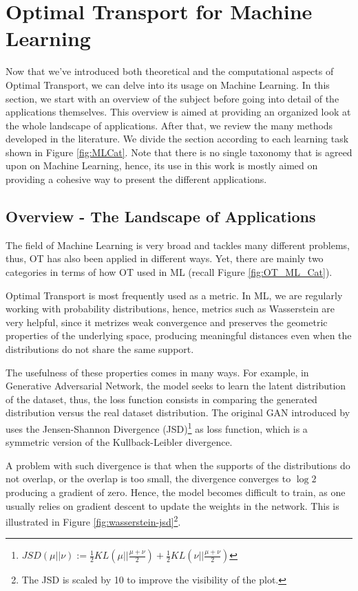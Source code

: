 \newpage
\chapter{Optimal Transport for Machine Learning}
\label{ch:otml}

Now that we've introduced both theoretical and the computational aspects of Optimal Transport,
we can delve into its usage on Machine Learning.
In this section, we start with an overview of the subject
before going into detail of the applications themselves.
This overview is aimed at providing an organized look at the whole landscape of applications.
After that, we review the many methods developed in the literature. 
We divide the section according to each learning task shown in Figure \ref{fig:MLCat}.
Note that there is no single taxonomy that is agreed upon on Machine Learning, hence,
its use in this work is mostly aimed on providing a cohesive way to present the different applications.

\section{Overview - The Landscape of Applications}

The field of Machine Learning is very broad and tackles many different problems, thus,
OT has also been applied in different ways. Yet, there are
mainly two categories in terms of how OT used in ML (recall Figure \ref{fig:OT_ML_Cat}).

Optimal Transport is most frequently used as a metric.
In ML, we are regularly working with probability distributions,
hence, metrics such as Wasserstein are very helpful, since
it metrizes weak convergence and preserves the geometric properties of the underlying space,
producing meaningful distances even when the distributions do not share the same support.

The usefulness of these properties comes in many ways. For example, in Generative Adversarial Network, the 
model seeks to learn the latent distribution of the dataset, thus, the loss function consists in
comparing the generated distribution versus the real dataset distribution. The original GAN introduced by
\citet{goodfellow2014} uses the Jensen-Shannon Divergence (JSD)\footnote{$JSD(\mu || \nu):=
\frac{1}{2} KL(\mu || \frac{\mu+\nu}{2}) +
\frac{1}{2} KL(\nu || \frac{\mu+\nu}{2})$}
as loss function, which is a symmetric
version of the Kullback-Leibler divergence.

A problem with such divergence is that when the supports of
the distributions do not overlap, or the overlap is too small, the divergence converges to $\log 2$
producing a gradient of zero.
Hence, the model becomes difficult to train, as one usually relies on gradient descent to update the weights
in the network. This is illustrated in Figure
\ref{fig:wasserstein-jsd}\footnote{The JSD is scaled by 10 to improve the visibility of the plot.}.

